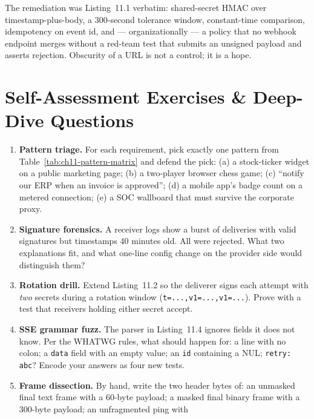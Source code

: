 The remediation was Listing~11.1 verbatim: shared-secret HMAC over
timestamp-plus-body, a 300-second tolerance window, constant-time comparison,
idempotency on event id, and --- organizationally --- a policy that no
webhook endpoint merges without a red-team test that submits an unsigned
payload and asserts rejection. Obscurity of a URL is not a control; it is a
hope.

\section{Self-Assessment Exercises \& Deep-Dive Questions}
\label{sec:ch11-exercises}

\begin{enumerate}[label=\textbf{E11.\arabic*.}, leftmargin=2.2cm]
  \item \textbf{Pattern triage.} For each requirement, pick exactly one
        pattern from Table~\ref{tab:ch11-pattern-matrix} and defend the pick:
        (a) a stock-ticker widget on a public marketing page; (b) a
        two-player browser chess game; (c) ``notify our ERP when an invoice
        is approved''; (d) a mobile app's badge count on a metered
        connection; (e) a SOC wallboard that must survive the corporate
        proxy.
  \item \textbf{Signature forensics.} A receiver logs show a burst of
        deliveries with valid signatures but timestamps 40 minutes old. All
        were rejected. What two explanations fit, and what one-line config
        change on the provider side would distinguish them?
  \item \textbf{Rotation drill.} Extend Listing~11.2 so the deliverer signs
        each attempt with \emph{two} secrets during a rotation window
        (\texttt{t=...,v1=...,v1=...}). Prove with a test that receivers
        holding either secret accept.
  \item \textbf{SSE grammar fuzz.} The parser in Listing~11.4 ignores fields
        it does not know. Per the WHATWG rules, what should happen for:
        a line with no colon; a \texttt{data} field with an empty value; an
        \texttt{id} containing a NUL; \texttt{retry: abc}? Encode your
        answers as four new tests.
  \item \textbf{Frame dissection.} By hand, write the two header bytes of:
        an unmasked final text frame with a 60-byte payload; a masked final
        binary frame with a 300-byte payload; an unfragmented ping with

\end{enumerate}
